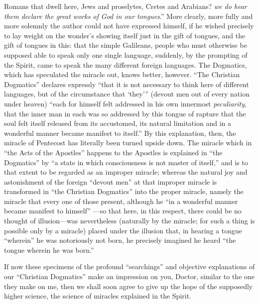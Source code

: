 \documentclass[12pt,a4paper]{article}
\newcommand{\opage}[1]{\marginnote{\footnotesize\textit{[#1]}}}
\begin{document}
Romans that dwell here, Jews and proselytes, Cretes and Arabians?
\emph{we do hear them declare the great works of God in our
tongues}.'' More clearly, more fully and more solemnly the author
could not have expressed himself, if he wished precisely to lay
weight on the wonder's showing itself just in the gift of tongues,
and the gift of tongues in this: that the simple Galileans, people
who must otherwise be supposed able to speak only one single
language, suddenly, by the prompting of the Spirit, came to speak
the many different foreign languages. The Dogmatics, which has
speculated the miracle out, knows better, however. ``The Christian
Dogmatics'' declares expressly ``that it is not necessary to think
here of different languages, but of the circumstance that `they'''
(devout men out of every nation under heaven) ``each for himself
felt addressed in his own innermost \emph{peculiarity}, that the
inner man in each was so addressed by this tongue of rapture that
the soul felt itself released from its accustomed, its natural
limitation and in a wonderful manner became manifest to itself.''
By this explanation, then, the miracle of Pentecost has literally
been turned upside down. The miracle which in ``the Acts of the
Apostles'' happens to the Apostles is explained in ``the Dogmatics''
by ``a state in which consciousness is not master of itself,''%
{} and is to that extent to be regarded as an improper miracle;
whereas the natural joy and astonishment of the foreign ``devout
men'' at that improper miracle is transformed in ``the Christian
Dogmatics'' into the proper miracle, namely the miracle that every
one of those present, although he ``in a wonderful manner became
manifest to himself''%
{}---so that here, in this respect, there could be no thought of
illusion---was nevertheless (naturally by the miracle; for such a
thing is possible only by a miracle) placed under the illusion that,
in hearing a tongue ``wherein'' he was notoriously not born, he
precisely imagined he heard ``the tongue wherein he was born.''

\opage{11}%
If now these specimens of the profound ``searchings'' and objective
explanations of our ``Christian Dogmatics'' make an impression on
you, Doctor, similar to the one they make on me, then we shall soon
agree to give up the hope of the supposedly higher science, the
science of miracles explained in the Spirit.
\end{document}
